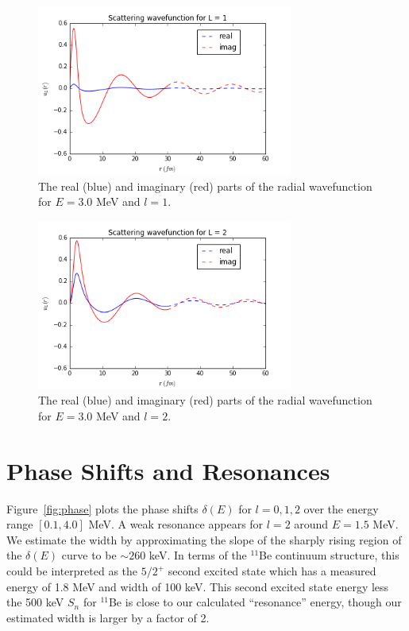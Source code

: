 \documentclass[]{scrartcl}
\begin{document}
\begin{figure}
\centering
	\includegraphics[width=0.75\textwidth]{figures/E30/l1.png}
	\caption{The real (blue) and imaginary (red) parts of the radial wavefunction for $E = 3.0$ MeV and $l=1$.}
	\label{fig:e30l1}
\end{figure}

\begin{figure}[h]
\centering
	\includegraphics[width=0.75\textwidth]{figures/E30/l2.png}
	\caption{The real (blue) and imaginary (red) parts of the radial wavefunction for $E = 3.0$ MeV and $l=2$.}
	\label{fig:e30l2}
\end{figure}


\section*{Phase Shifts and Resonances}

Figure~\ref{fig:phase} plots the phase shifts $\delta(E)$ for $l=0,1,2$ over the energy range $[0.1,4.0]$ MeV. A weak resonance appears for $l=2$ around $E=1.5$ MeV. We estimate the width by approximating the slope of the sharply rising region of the $\delta (E)$ curve to be $\sim 260$ keV. In terms of the $^{11}$Be continuum structure, this could be interpreted as the $5/2 ^+$ second excited state which has a measured energy of 1.8 MeV and width of 100 keV. This second excited state energy less the 500 keV $S _n $ for $^{11}$Be is close to our calculated ``resonance'' energy, though our estimated width is larger by a factor of 2.
\end{document}
